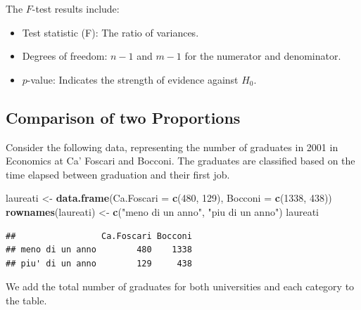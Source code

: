 \documentclass[
]{article}
\newenvironment{Shaded}{\begin{snugshade}}{\end{snugshade}}
\newcommand{\AttributeTok}[1]{\textcolor[rgb]{0.13,0.29,0.53}{#1}}
\newcommand{\DecValTok}[1]{\textcolor[rgb]{0.00,0.00,0.81}{#1}}
\newcommand{\FunctionTok}[1]{\textcolor[rgb]{0.13,0.29,0.53}{\textbf{#1}}}
\newcommand{\NormalTok}[1]{#1}
\newcommand{\OtherTok}[1]{\textcolor[rgb]{0.56,0.35,0.01}{#1}}
\newcommand{\SpecialCharTok}[1]{\textcolor[rgb]{0.81,0.36,0.00}{\textbf{#1}}}
\newcommand{\StringTok}[1]{\textcolor[rgb]{0.31,0.60,0.02}{#1}}
\providecommand{\tightlist}{%
  \setlength{\itemsep}{0pt}\setlength{\parskip}{0pt}}
\begin{document}
The \(F\)-test results include:

\begin{itemize}
\tightlist
\item
  Test statistic (F): The ratio of variances.
\item
  Degrees of freedom: \(n - 1\) and \(m - 1\) for the numerator and
  denominator.
\item
  \(p\)-value: Indicates the strength of evidence against \(H_0\).
\end{itemize}

\hypertarget{comparison-of-two-proportions}{%
\subsection{Comparison of two
Proportions}\label{comparison-of-two-proportions}}

Consider the following data, representing the number of graduates in
2001 in Economics at Ca' Foscari and Bocconi. The graduates are
classified based on the time elapsed between graduation and their first
job.

\begin{Shaded}
\begin{Highlighting}[]
\NormalTok{laureati }\OtherTok{\textless{}{-}} \FunctionTok{data.frame}\NormalTok{(}\AttributeTok{Ca.Foscari =} \FunctionTok{c}\NormalTok{(}\DecValTok{480}\NormalTok{, }\DecValTok{129}\NormalTok{), }\AttributeTok{Bocconi =} \FunctionTok{c}\NormalTok{(}\DecValTok{1338}\NormalTok{, }\DecValTok{438}\NormalTok{))}
\FunctionTok{rownames}\NormalTok{(laureati) }\OtherTok{\textless{}{-}} \FunctionTok{c}\NormalTok{(}\StringTok{"meno di un anno"}\NormalTok{, }\StringTok{"piu\textquotesingle{} di un anno"}\NormalTok{)}
\NormalTok{laureati}
\end{Highlighting}
\end{Shaded}

\begin{verbatim}
##                 Ca.Foscari Bocconi
## meno di un anno        480    1338
## piu' di un anno        129     438
\end{verbatim}

We add the total number of graduates for both universities and each
category to the table.

\begin{Shaded}
\end{Shaded}
\end{document}
